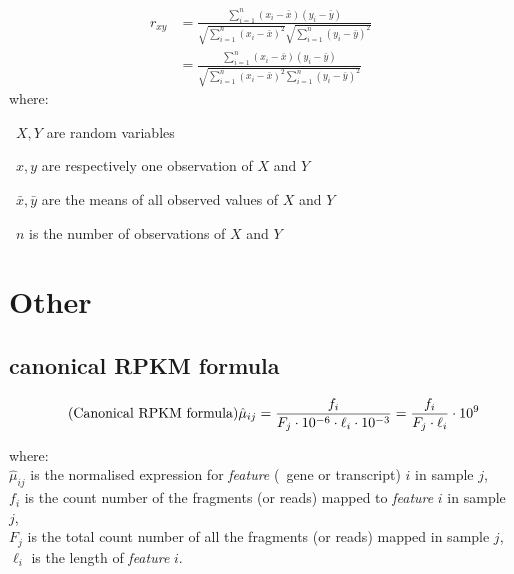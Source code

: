 \documentclass[a4paper, headinclude, footinclude, BCOR=1cm]{scrbook}
\begin{document}
\begin{equation}
    \tag{Sample Pearson correlation}
    \begin{split}
    r_{xy} & = \frac{\sum ^n _{i=1}(x_i - \bar{x})(y_i - \bar{y})}%
    {\sqrt{\sum ^n _{i=1}(x_i - \bar{x})^2} \sqrt{\sum ^n _{i=1}(y_i - \bar{y})^2}}\\
           & = \frac{\sum\limits_{i=1}^n (x_i-\bar{x})(y_i-\bar{y})}
            {\sqrt{\sum\limits_{i=1}^n (x_i-\bar{x})^2 \sum\limits_{i=1}^n (y_i-\bar{y})^2}}
    \end{split}
\end{equation}
where:
\quad\begin{eqlist}
    \item[\textbullet\ $X,Y$] are random variables
    \item[\textbullet\ $x,y$] are respectively one observation of $X$ and $Y$
    \item[\textbullet\ $\bar{x},\bar{y}$] are the means
        of all observed values of $X$ and $Y$
    \item[\textbullet\ $n$] is the number of observations of $X$ and $Y$
\end{eqlist}

\chapter{Other}

\section{canonical RPKM formula}

\begin{equation}
     \tag{Canonical RPKM formula}\label{eq:rpkm-fx}
 \hat{\mu}_{ij} = \frac{f_i}{F_j\cdot10^{-6} \cdot \ell_i\cdot10^{-3}}
                = \frac{f_i}{F_j\cdot\ell_i}\cdot10^{9} \text{\,}
 \end{equation}

 where: \\{\small
 $\hat{\mu}_{ij}$ is the normalised expression for \emph{feature} (\eg\ gene or
 transcript) $i$ in sample $j$,\\
 $f_i$ is the count number of the fragments (or reads) mapped to
 \emph{feature} $i$ in sample $j$,\\
 $F_j$ is the total count number of all the fragments (or reads) mapped in
 sample $j$,\\
 $\ell_i$ is the length of \emph{feature} $i$.
 }
\end{document}

